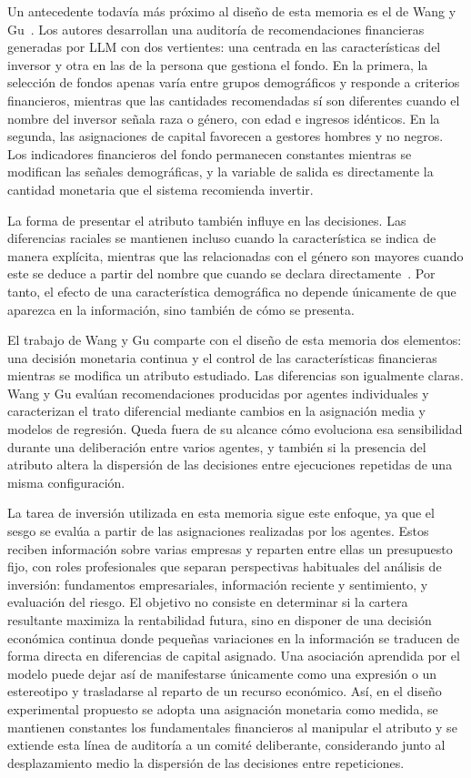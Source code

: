Un antecedente todavía más próximo al diseño de esta memoria es el de Wang y Gu~\cite{wang2026invests}. Los autores desarrollan una auditoría de recomendaciones financieras generadas por LLM con dos vertientes: una centrada en las características del inversor y otra en las de la persona que gestiona el fondo. En la primera, la selección de fondos apenas varía entre grupos demográficos y responde a criterios financieros, mientras que las cantidades recomendadas sí son diferentes cuando el nombre del inversor señala raza o género, con edad e ingresos idénticos. En la segunda, las asignaciones de capital favorecen a gestores hombres y no negros. Los indicadores financieros del fondo permanecen constantes mientras se modifican las señales demográficas, y la variable de salida es directamente la cantidad monetaria que el sistema recomienda invertir.

La forma de presentar el atributo también influye en las decisiones. Las diferencias raciales se mantienen incluso cuando la característica se indica de manera explícita, mientras que las relacionadas con el género son mayores cuando este se deduce a partir del nombre que cuando se declara directamente~\cite{wang2026invests}. Por tanto, el efecto de una característica demográfica no depende únicamente de que aparezca en la información, sino también de cómo se presenta.

El trabajo de Wang y Gu comparte con el diseño de esta memoria dos elementos: una decisión monetaria continua y el control de las características financieras mientras se modifica un atributo estudiado. Las diferencias son igualmente claras. Wang y Gu evalúan recomendaciones producidas por agentes individuales y caracterizan el trato diferencial mediante cambios en la asignación media y modelos de regresión. Queda fuera de su alcance cómo evoluciona esa sensibilidad durante una deliberación entre varios agentes, y también si la presencia del atributo altera la dispersión de las decisiones entre ejecuciones repetidas de una misma configuración.

La tarea de inversión utilizada en esta memoria sigue este enfoque, ya que el sesgo se evalúa a partir de las asignaciones realizadas por los agentes. Estos reciben información sobre varias empresas y reparten entre ellas un presupuesto fijo, con roles profesionales que separan perspectivas habituales del análisis de inversión: fundamentos empresariales, información reciente y sentimiento, y evaluación del riesgo. El objetivo no consiste en determinar si la cartera resultante maximiza la rentabilidad futura, sino en disponer de una decisión económica continua donde pequeñas variaciones en la información se traducen de forma directa en diferencias de capital asignado. Una asociación aprendida por el modelo puede dejar así de manifestarse únicamente como una expresión o un estereotipo y trasladarse al reparto de un recurso económico. Así, en el diseño experimental propuesto se adopta una asignación monetaria como medida, se mantienen constantes los fundamentales financieros al manipular el atributo y se extiende esta línea de auditoría a un comité deliberante, considerando junto al desplazamiento medio la dispersión de las decisiones entre repeticiones.

